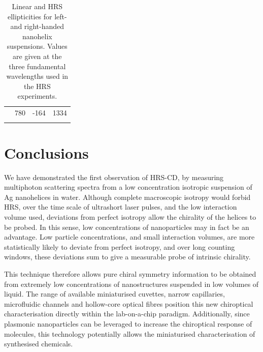 \begin{table}[tbp]
\begin{tabular}{llll}
                                                                & 780                                                                    & -164                                                                  & 1334                                                               \\ 
    \lasthline
    \end{tabular}
    \caption{Linear and HRS ellipticities for left- and right-handed nanohelix suspensions. Values are given at the three fundamental wavelengths used in the HRS experiments.}
    \label{table:HRS:ellipticity}
\end{table}


\section{Conclusions}
We have demonstrated the first observation of HRS-CD, by measuring multiphoton scattering spectra from a low concentration isotropic suspension of Ag nanohelices in water. Although complete macroscopic isotropy would forbid HRS, over the time scale of ultrashort laser pulses, and the low interaction volume used, deviations from perfect isotropy allow the chirality of the helices to be probed. In this sense, low concentrations of nanoparticles may in fact be an advantage. Low particle concentrations, and small interaction volumes, are more statistically likely to deviate from perfect isotropy, and over long counting windows, these deviations sum to give a measurable probe of intrinsic chirality.

This technique therefore allows pure chiral symmetry information to be obtained from extremely low concentrations of nanostructures suspended in low volumes of liquid. The range of available miniaturised cuvettes, narrow capillaries, microfluidic channels and hollow-core optical fibres position this new chiroptical characterisation directly within the lab-on-a-chip paradigm. Additionally, since plasmonic nanoparticles can be leveraged to increase the chiroptical response of molecules, this technology potentially allows the miniaturised characterisation of synthesised chemicals. 

